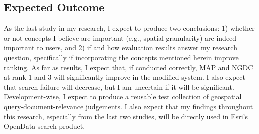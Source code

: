 

\subsection{Expected Outcome}
As the last study in my research, I expect to produce two conclusions: 1) whether or not concepts I believe are important (e.g., spatial granularity) are indeed important to users, and 2) if and how evaluation results answer my research question, specifically if incorporating the concepts mentioned herein improve ranking. As far as results, I expect that, if conducted correctly, MAP and NGDC at rank 1 and 3 will significantly improve in the modified system. I also expect that search failure will decrease, but I am uncertain if it will be significant. Development-wise, I expect to produce a reusable test collection of geospatial query-document-relevance judgements. I also expect that my findings throughout this research, especially from the last two studies, will be directly used in Esri's OpenData search product.


